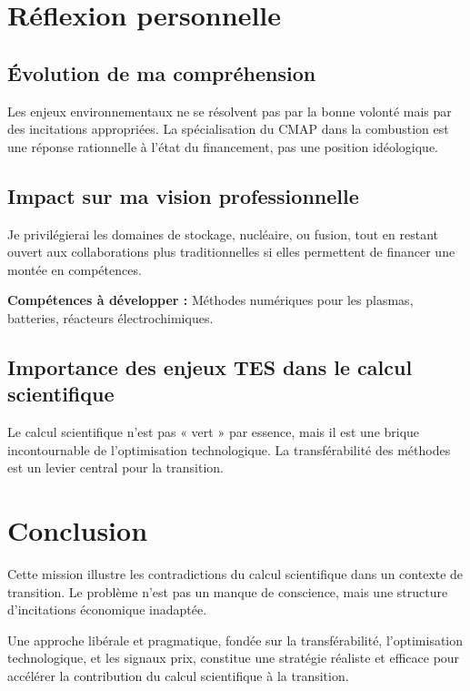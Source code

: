 \documentclass[11pt,a4paper]{article}
\begin{document}
\section{Réflexion personnelle}

\subsection{Évolution de ma compréhension}

Les enjeux environnementaux ne se résolvent pas par la bonne volonté mais par des incitations appropriées. La spécialisation du CMAP dans la combustion est une réponse rationnelle à l’état du financement, pas une position idéologique.

\subsection{Impact sur ma vision professionnelle}

Je privilégierai les domaines de stockage, nucléaire, ou fusion, tout en restant ouvert aux collaborations plus traditionnelles si elles permettent de financer une montée en compétences.

\textbf{Compétences à développer :} Méthodes numériques pour les plasmas, batteries, réacteurs électrochimiques.

\subsection{Importance des enjeux TES dans le calcul scientifique}

Le calcul scientifique n'est pas « vert » par essence, mais il est une brique incontournable de l’optimisation technologique. La transférabilité des méthodes est un levier central pour la transition.

\section{Conclusion}

Cette mission illustre les contradictions du calcul scientifique dans un contexte de transition. Le problème n’est pas un manque de conscience, mais une structure d’incitations économique inadaptée.

Une approche libérale et pragmatique, fondée sur la transférabilité, l’optimisation technologique, et les signaux prix, constitue une stratégie réaliste et efficace pour accélérer la contribution du calcul scientifique à la transition.
\end{document}
